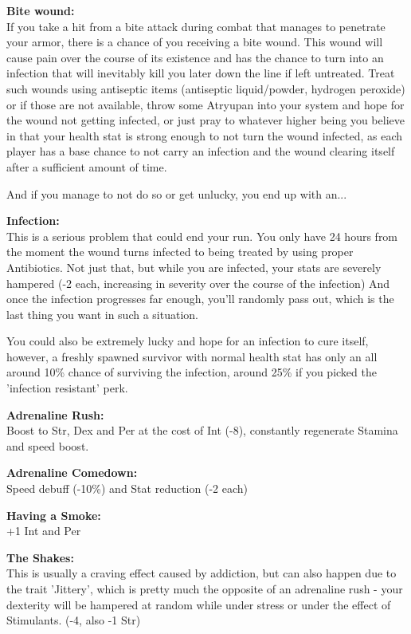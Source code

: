 \textbf{Bite wound:}\\If you take a hit from a bite attack during combat that manages to penetrate your armor, there is a chance of you receiving a bite wound. This wound will cause pain over the course of its existence and has the chance to turn into an infection that will inevitably kill you later down the line if left untreated. Treat such wounds using antiseptic items (antiseptic liquid/powder, hydrogen peroxide) or if those are not available, throw some Atryupan into your system and hope for the wound not getting infected, or just pray to whatever higher being you believe in that your health stat is strong enough to not turn the wound infected, as each player has a base chance to not carry an infection and the wound clearing itself after a sufficient amount of time.

And if you manage to not do so or get unlucky, you end up with an...

\textbf{Infection:}\\This is a serious problem that could end your run. You only have 24 hours from the moment the wound turns infected to being treated by using proper Antibiotics. Not just that, but while you are infected, your stats are severely hampered (-2 each, increasing in severity over the course of the infection) And once the infection progresses far enough, you'll randomly pass out, which is the last thing you want in such a situation.

You could also be extremely lucky and hope for an infection to cure itself, however, a freshly spawned survivor with normal health stat has only an all around 10\% chance of surviving the infection, around 25\% if you picked the 'infection resistant' perk.

\textbf{Adrenaline Rush:}\\Boost to Str, Dex and Per at the cost of Int (-8), constantly regenerate Stamina and speed boost.

\textbf{Adrenaline Comedown:}\\Speed debuff (-10\%) and Stat reduction (-2 each)

\textbf{Having a Smoke:}\\+1 Int and Per

\textbf{The Shakes:}\\This is usually a craving effect caused by addiction, but can also happen due to the trait 'Jittery', which is pretty much the opposite of an adrenaline rush - your dexterity will be hampered at random while under stress or under the effect of Stimulants. (-4, also -1 Str)

